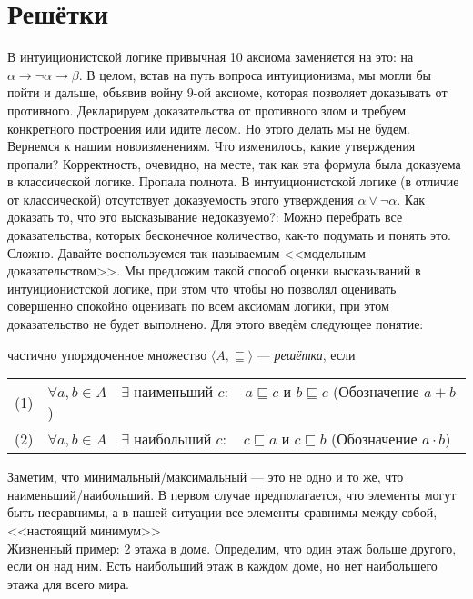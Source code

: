 \section{Решётки}
\author{ruperson}
В интуиционистской логике привычная 10 аксиома заменяется на это:
на $\alpha \rightarrow \neg \alpha \rightarrow \beta$.
В целом, встав на путь вопроса интуиционизма, мы могли бы пойти и дальше, объявив войну 9-ой аксиоме, которая позволяет доказывать от противного. Декларируем доказательства от противного злом и требуем конкретного построения или идите лесом. Но этого делать мы не будем.
Вернемся к нашим новоизменениям. Что изменилось, какие утверждения пропали? Корректность, очевидно, на месте, так как эта формула была доказуема в классической логике. Пропала полнота.
В интуиционистской логике (в отличие от классической) отсутствует доказуемость этого утверждения $\alpha \vee \neg \alpha $.
Как доказать то, что это высказывание недоказуемо?:  Можно перебрать все доказательства, которых бесконечное количество, как-то подумать и понять это. Сложно. Давайте воспользуемся так называемым <<модельным доказательством>>. Мы предложим такой способ оценки высказываний в интуиционистской логике, при этом что чтобы но позволял оценивать совершенно спокойно оценивать по всем аксиомам логики, при этом доказательство не будет выполнено. Для этого введём следующее понятие:

\begin{definition} частично упорядоченное множество $\langle{}A, \sqsubseteq  \rangle$ ---  \emph{решётка}, если
	
	\begin{tabular}{ll}
		(1) & $\forall a,b \in A \quad \exists$ наименьший $c: \quad a \sqsubseteq c$ и $b \sqsubseteq c $ (Обозначение $a+b$)\\
		(2) & $\forall a,b \in A \quad \exists$ наибольший $c: \quad c \sqsubseteq a$ и $c \sqsubseteq b$ (Обозначение $a \cdot b$)
	\end{tabular}
\end{definition}
Заметим, что минимальный/максимальный --- это не одно и то же, что наименьший/наибольший. В первом случае предполагается, что элементы могут быть несравнимы, а в нашей ситуации все элементы сравнимы между собой, <<настоящий минимум>> \\
Жизненный пример: 2 этажа в доме. Определим, что один этаж больше другого, если он над ним. Есть наибольший этаж в каждом доме, но нет наибольшего этажа для всего мира.


